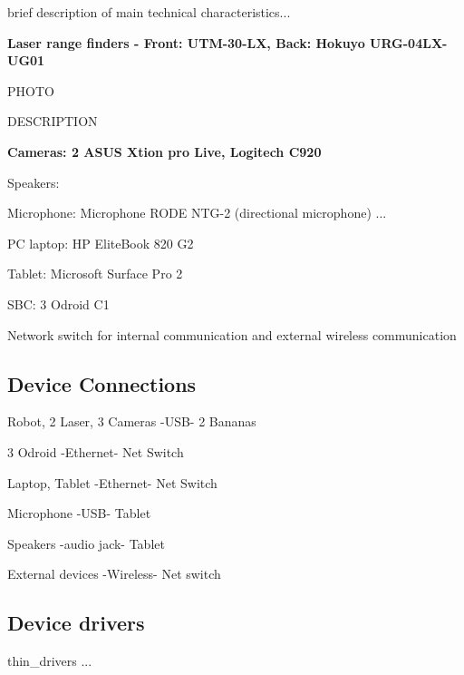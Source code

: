 brief description of main technical characteristics...



{\bf Laser range finders - Front: UTM-30-LX, Back: Hokuyo URG-04LX-UG01}

PHOTO

DESCRIPTION



{\bf Cameras: 2 ASUS Xtion pro Live, Logitech C920}




Speakers:

Microphone: Microphone RODE NTG-2  (directional microphone) ...

PC laptop: HP EliteBook 820 G2

Tablet: Microsoft Surface Pro 2

SBC: 3 Odroid C1

Network switch for internal communication and external wireless communication




\subsection{Device Connections}

Robot, 2 Laser, 3 Cameras -USB- 2 Bananas

3 Odroid  -Ethernet- Net Switch

Laptop, Tablet -Ethernet- Net Switch

Microphone -USB- Tablet

Speakers -audio jack- Tablet

External devices -Wireless- Net switch



\subsection{Device drivers}

thin\_drivers ...






